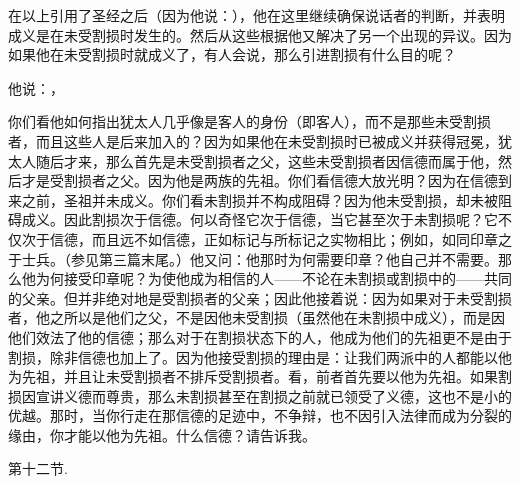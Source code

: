 \par

在以上引用了圣经之后（因为他说：），他在这里继续确保说话者的判断，并表明成义是在未受割损时发生的。然后从这些根据他又解决了另一个出现的异议。因为如果他在未受割损时就成义了，有人会说，那么引进割损有什么目的呢？\par

 他说：，\par

你们看他如何指出犹太人几乎像是客人的身份（即客人），而不是那些未受割损者，而且这些人是后来加入的？因为如果他在未受割损时已被成义并获得冠冕，犹太人随后才来，那么首先是未受割损者之父，这些未受割损者因信德而属于他，然后才是受割损者之父。因为他是两族的先祖。你们看信德大放光明？因为在信德到来之前，圣祖并未成义。你们看未割损并不构成阻碍？因为他未受割损，却未被阻碍成义。因此割损次于信德。何以奇怪它次于信德，当它甚至次于未割损呢？它不仅次于信德，而且远不如信德，正如标记与所标记之实物相比；例如，如同印章之于士兵。（参见第三篇末尾。）他又问：他那时为何需要印章？他自己并不需要。那么他为何接受印章呢？为使他成为相信的人——不论在未割损或割损中的——共同的父亲。但并非绝对地是受割损者的父亲；因此他接着说：因为如果对于未受割损者，他之所以是他们之父，不是因他未受割损（虽然他在未割损中成义），而是因他们效法了他的信德；那么对于在割损状态下的人，他成为他们的先祖更不是由于割损，除非信德也加上了。因为他接受割损的理由是：让我们两派中的人都能以他为先祖，并且让未受割损者不排斥受割损者。看，前者首先要以他为先祖。如果割损因宣讲义德而尊贵，那么未割损甚至在割损之前就已领受了义德，这也不是小的优越。那时，当你行走在那信德的足迹中，不争辩，也不因引入法律而成为分裂的缘由，你才能以他为先祖。什么信德？请告诉我。\par

第十二节. \par


